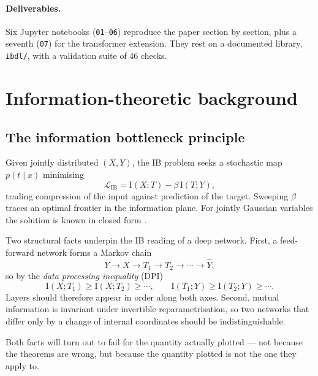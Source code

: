 \documentclass[11pt,a4paper]{article}
\newcommand{\I}{\mathrm{I}}
\begin{document}
\paragraph{Deliverables.}
Six Jupyter notebooks (\texttt{01}--\texttt{06}) reproduce the paper section by
section, plus a seventh (\texttt{07}) for the transformer extension. They rest on
a documented library, \texttt{ibdl/}, with a validation suite of 46 checks.

\section{Information-theoretic background}

\subsection{The information bottleneck principle}

Given jointly distributed $(X,Y)$, the IB problem \citep{tishby1999information}
seeks a stochastic map $p(t \mid x)$ minimising
\begin{equation}
  \mathcal{L}_{\mathrm{IB}} = \I(X;T) - \beta\,\I(T;Y),
  \label{eq:ib}
\end{equation}
trading compression of the input against prediction of the target. Sweeping
$\beta$ traces an optimal frontier in the information plane. For jointly Gaussian
variables the solution is known in closed form \citep{chechik2005information}.

Two structural facts underpin the IB reading of a deep network. First, a
feed-forward network forms a Markov chain
\begin{equation}
  Y \rightarrow X \rightarrow T_1 \rightarrow T_2 \rightarrow \cdots \rightarrow \hat{Y},
\end{equation}
so by the \emph{data processing inequality} (DPI) \citep{cover2006elements}
\begin{equation}
  \I(X;T_1) \ge \I(X;T_2) \ge \cdots, \qquad
  \I(T_1;Y) \ge \I(T_2;Y) \ge \cdots .
  \label{eq:dpi}
\end{equation}
Layers should therefore appear in order along both axes. Second, mutual
information is invariant under invertible reparametrisation, so two networks that
differ only by a change of internal coordinates should be indistinguishable.

Both facts will turn out to fail for the quantity actually plotted --- not
because the theorems are wrong, but because the quantity plotted is not the one
they apply to.
\end{document}
